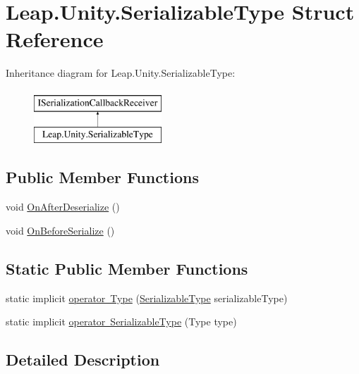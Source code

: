 \hypertarget{struct_leap_1_1_unity_1_1_serializable_type}{}\section{Leap.\+Unity.\+Serializable\+Type Struct Reference}
\label{struct_leap_1_1_unity_1_1_serializable_type}
Inheritance diagram for Leap.\+Unity.\+Serializable\+Type\+:\begin{figure}[H]
\begin{center}
\leavevmode
\includegraphics[height=2.000000cm]{struct_leap_1_1_unity_1_1_serializable_type}
\end{center}
\end{figure}
\subsection*{Public Member Functions}
\begin{DoxyCompactItemize}
\item 
void \mbox{\hyperlink{struct_leap_1_1_unity_1_1_serializable_type_afe35445b84e855c5f5f268111c0ed27a}{On\+After\+Deserialize}} ()
\item 
void \mbox{\hyperlink{struct_leap_1_1_unity_1_1_serializable_type_aed101eb8bd9270d427c3560d39d6b0d7}{On\+Before\+Serialize}} ()
\end{DoxyCompactItemize}
\subsection*{Static Public Member Functions}
\begin{DoxyCompactItemize}
\item 
static implicit \mbox{\hyperlink{struct_leap_1_1_unity_1_1_serializable_type_a157197c60fdfac0d01be0aea49da81c6}{operator Type}} (\mbox{\hyperlink{struct_leap_1_1_unity_1_1_serializable_type}{Serializable\+Type}} serializable\+Type)
\item 
static implicit \mbox{\hyperlink{struct_leap_1_1_unity_1_1_serializable_type_ac44e28f0b34313096a13896100c724e6}{operator Serializable\+Type}} (Type type)
\end{DoxyCompactItemize}


\subsection{Detailed Description}


